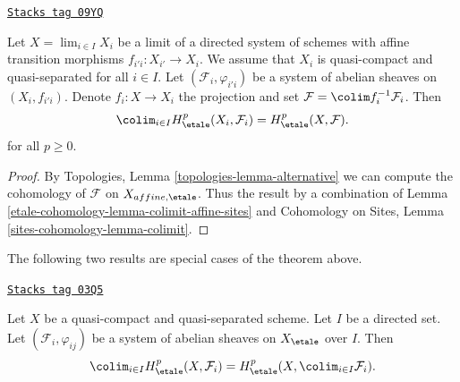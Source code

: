 \begin{theorem}[Colimit]
\label{etale-cohomology-theorem-colimit}
\href{https://stacks.math.columbia.edu/tag/09YQ}{\texttt{Stacks tag 09YQ}}

Let $X = \lim_{i \in I} X_i$ be a limit of a directed system of schemes
with affine transition morphisms $f_{i'i} : X_{i'} \to X_i$. We assume
that $X_i$ is quasi-compact and quasi-separated for all $i \in I$.
Let $(\mathcal{F}_i, \varphi_{i'i})$ be a system of abelian sheaves
on $(X_i, f_{i'i})$. Denote $f_i : X \to X_i$ the projection and set
$\mathcal{F} = \colim f_i^{-1}\mathcal{F}_i$. Then
$$
\colim_{i\in I} H_\etale^p(X_i, \mathcal{F}_i) = H_\etale^p(X, \mathcal{F}).
$$
for all $p \geq 0$.
\end{theorem}

\begin{proof}
By Topologies, Lemma \ref{topologies-lemma-alternative}
we can compute the cohomology
of $\mathcal{F}$ on $X_{affine, \etale}$.
Thus the result by a combination of
Lemma \ref{etale-cohomology-lemma-colimit-affine-sites}
and
Cohomology on Sites, Lemma \ref{sites-cohomology-lemma-colimit}.
\end{proof}

The following two results are special cases of the theorem above.

\begin{lemma}[Colimit]
\label{etale-cohomology-lemma-colimit}
\href{https://stacks.math.columbia.edu/tag/03Q5}{\texttt{Stacks tag 03Q5}}

Let $X$ be a quasi-compact and quasi-separated scheme. Let $I$
be a directed set. Let $(\mathcal{F}_i, \varphi_{ij})$ be a system
of abelian sheaves on $X_\etale$ over $I$. Then
$$
\colim_{i\in I} H_\etale^p(X, \mathcal{F}_i) = H_\etale^p(X,
\colim_{i\in I} \mathcal{F}_i).
$$
\end{lemma}

